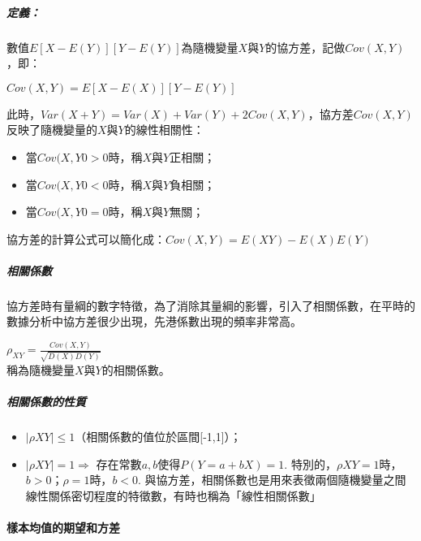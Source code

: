 \documentclass[11pt]{article}
\providecommand{\tightlist}{%
      \setlength{\itemsep}{0pt}\setlength{\parskip}{0pt}}
\begin{document}
\hypertarget{ux5b9aux7fa9}{%
\subparagraph{定義：}\label{ux5b9aux7fa9}}

數值\(E[X-E(Y)][Y-E(Y)]\)為隨機變量\(X\)與\(Y\)的協方差，記做\(Cov(X,Y)\)，即：

\(Cov(X, Y) = E{[X - E(X)][Y - E(Y)]}\)

此時，\(Var(X + Y) = Var(X) + Var(Y) + 2Cov(X,Y)\)，協方差\(Cov(X, Y)\)反映了隨機變量的\(X\)與\(Y\)的線性相關性：

\begin{itemize}
\tightlist
\item
  當\(Cov(X,Y0 > 0\)時，稱\(X\)與\(Y\)正相關；
\item
  當\(Cov(X,Y0 < 0\)時，稱\(X\)與\(Y\)負相關；
\item
  當\(Cov(X,Y0 = 0\)時，稱\(X\)與\(Y\)無關；
\end{itemize}

協方差的計算公式可以簡化成：\(Cov(X,Y) = E(XY) - E(X)E(Y)\)

    \hypertarget{ux76f8ux95dcux4fc2ux6578}{%
\subparagraph{相關係數}\label{ux76f8ux95dcux4fc2ux6578}}

協方差時有量綱的數字特徵，為了消除其量綱的影響，引入了相關係數，在平時的數據分析中協方差很少出現，先港係數出現的頻率非常高。

\(\rho_{XY} = \frac{Cov(X, Y)}{\sqrt{D(X)D(Y)}}\)\\

稱為隨機變量\(X\)與\(Y\)的相關係數。

\hypertarget{ux76f8ux95dcux4fc2ux6578ux7684ux6027ux8cea}{%
\subparagraph{相關係數的性質}\label{ux76f8ux95dcux4fc2ux6578ux7684ux6027ux8cea}}

\begin{itemize}
\tightlist
\item
  \(|\rho XY|\leq 1\)（相關係數的值位於區間{[}-1,1{]}）；
\item
  \(|\rho XY| = 1 \Rightarrow\) 存在常數\(a,b\)使得\(P(Y = a+bX)=1\).
  特別的，\(\rho XY = 1\)時，\(b > 0\)；\(\rho = 1\)時，\(b < 0\).
  與協方差，相關係數也是用來表徵兩個隨機變量之間線性關係密切程度的特徵數，有時也稱為「線性相關係數」
\end{itemize}

    \hypertarget{ux6a23ux672cux5747ux503cux7684ux671fux671bux548cux65b9ux5dee}{%
\paragraph{樣本均值的期望和方差}\label{ux6a23ux672cux5747ux503cux7684ux671fux671bux548cux65b9ux5dee}}
\end{document}
